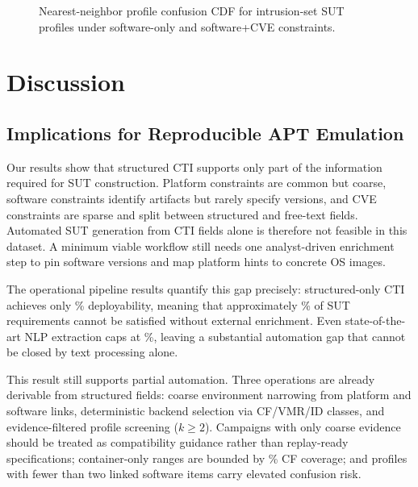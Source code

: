\documentclass[sigconf,anonymous,review]{acmart}
\begin{document}
\begin{figure}[!htb]
\centering
\resizebox{\columnwidth}{!}{}
\caption{\label{fig:jaccard_cdf}Nearest-neighbor profile confusion CDF for intrusion-set SUT
profiles under software-only and software+CVE constraints.
}
\end{figure}


\section{Discussion}\label{sec:discussion}

\subsection{Implications for Reproducible APT Emulation}

Our results show that structured CTI supports only part of the information required for SUT construction. Platform constraints are common but coarse, software constraints identify artifacts but rarely specify versions, and CVE constraints are sparse and split between structured and free-text fields. Automated SUT generation from CTI fields alone is therefore not feasible in this dataset. A minimum viable workflow still needs one analyst-driven enrichment step to pin software versions and map platform hints to concrete OS images.

The operational pipeline results quantify this gap precisely: structured-only CTI achieves only \pipelinesructuredscore\% deployability, meaning that approximately \pipelinegappercentage\% of SUT requirements cannot be satisfied without external enrichment. Even state-of-the-art NLP extraction caps at \pipelinenlpscore\%, leaving a substantial automation gap that cannot be closed by text processing alone.

This result still supports partial automation. Three operations are already derivable from structured fields: coarse environment narrowing from platform and software links, deterministic backend selection via CF/VMR/ID classes, and evidence-filtered profile screening ($k \geq 2$). Campaigns with only coarse evidence should be treated as compatibility guidance rather than replay-ready specifications; container-only ranges are bounded by \compatibilitycontainerfeasiblepercentage\% CF coverage; and profiles with fewer than two linked software items carry elevated confusion risk.
\end{document}
